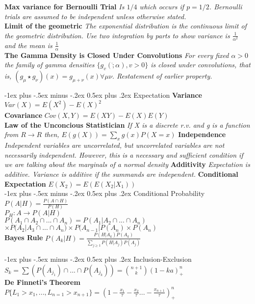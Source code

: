 \documentclass[10pt,landscape]{article}
\makeatletter
\renewcommand{\section}{\@startsection{section}{1}{0mm}%
                                {-1ex plus -.5ex minus -.2ex}%
                                {0.5ex plus .2ex}%
                                {\normalfont\large\bfseries}}
\makeatother
\begin{document}
\begin{multicols*}{3}
\textbf{Max variance for Bernoulli Trial} \textit{Is $1/4$ which occurs if $p=1/2$. Bernoulli trials are assumed to be independent unless otherwise stated.}\\
\textbf{Limit of the geometric} \textit{The exponential distribution is the continuous limit of the geometric distribution. Use two integration by parts to show variance is $\frac{1}{\alpha^2}$ and the mean is $\frac{1}{\alpha}$}\\
\textbf{The Gamma Density is Closed Under Convolutions} \textit{For every fixed $\alpha>0$ the family of gamma densities $\{g_v(\dot;\alpha), v>0\}$ is closed under convolutions, that is, $(g_\mu\star g_\nu)(x)=g_{\mu+\nu}(x) \forall\mu \nu$. Restatement of earlier property.}

\section{Expectation}
\textbf{Variance} $Var(X)=E(X^2)-E(X)^2$\\
\textbf{Covariance} $Cov(X,Y)=E(XY)- E(X)E(Y)$\\
\textbf{Law of the Unconcious Statistician}
 \textit{If X is a discrete r.v. and g is a function from {$R\rightarrow R$} then, $E(g(X))=\sum_{x}g(x)P(X=x)$}
\textbf{Independence} \textit{Independent variables are uncorrelated, but uncorrelated variables are not necessarily independent. However, this is a necessary and sufficient condition if we are talking about the marginals of a normal density}
\textbf{Additivity} \textit{Expectation is additive. Variance is additive if the summands are independent.}
\textbf{Conditional Expectation} \textit{$E(X_2)=E(E(X_2|X_1))$}\\


\section{Conditional Probability}
$P(A|H)=\frac{P(A \cap H)}{P(H)}$\\
$P_H: A \rightarrow P(A|H)$\\
$P(A_1 \cap A_2 \cap ... \cap A_n)= P(A_1|A_2 \cap ... \cap A_n)$\\ $\times P(A_2|A_3 \cap ... \cap A_n) \times P(A_{n-1}|P(A_n) \times P(A_n)$\\
\textbf{Bayes Rule}
$P(A_k|H)=\frac{P(H|A_k)P(A_k)}{\sum_{j \geq 1}{} P(H|A_j)P(A_j)}$

\section{Inclusion-Exclusion}
\textit{$S_k= \sum (P(A_{j_1}) \cap...\cap P(A_{j_k}))={n+1 \choose k} (1-ka)^n_+$}\\
\textbf{De Finneti's Theorem}\\
\textit{$P\{L_1>x_1,...,L_{n=1}>x_{n+1}\}=(1-\frac{x_1}{\tau}-\frac{x_2}{\tau}...-\frac{x_{n+1}}{\tau})^n_+$}\\

\end{multicols*}
\end{document}

